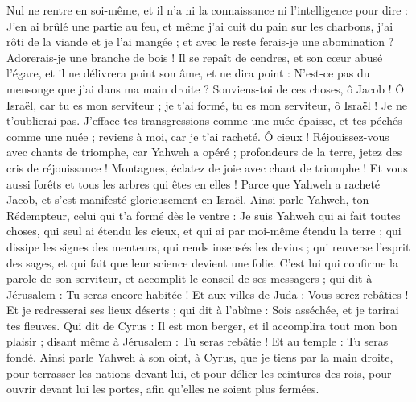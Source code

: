 \begin{multicols}{2}
Nul ne rentre en soi-même, et il n'a ni la connaissance ni l'intelligence pour dire : J'en ai brûlé une partie au feu, et même j'ai cuit du pain sur les charbons, j'ai rôti de la viande et je l'ai mangée ; et avec le reste ferais-je une abomination ? Adorerais-je une branche de bois !
Il se repaît de cendres, et son cœur abusé l'égare, et il ne délivrera point son âme, et ne dira point : N'est-ce pas du mensonge que j'ai dans ma main droite ?
Souviens-toi de ces choses, ô Jacob ! Ô Israël, car tu es mon serviteur ; je t'ai formé, tu es mon serviteur, ô Israël ! Je ne t'oublierai pas.
J'efface tes transgressions comme une nuée épaisse, et tes péchés comme une nuée ; reviens à moi, car je t'ai racheté.
Ô cieux ! Réjouissez-vous avec chants de triomphe, car Yahweh a opéré ; profondeurs de la terre, jetez des cris de réjouissance ! Montagnes, éclatez de joie avec chant de triomphe ! Et vous aussi forêts et tous les arbres qui êtes en elles ! Parce que Yahweh a racheté Jacob, et s'est manifesté glorieusement en Israël.
Ainsi parle Yahweh, ton Rédempteur, celui qui t'a formé dès le ventre : Je suis Yahweh qui ai fait toutes choses, qui seul ai étendu les cieux, et qui ai par moi-même étendu la terre ;
qui dissipe les signes des menteurs, qui rends insensés les devins ; qui renverse l'esprit des sages, et qui fait que leur science devient une folie.
C'est lui qui confirme la parole de son serviteur, et accomplit le conseil  de ses messagers ; qui dit à Jérusalem : Tu seras encore habitée ! Et aux villes de Juda : Vous serez rebâties ! Et je redresserai ses lieux déserts ;
qui dit à l'abîme : Sois asséchée, et je tarirai tes fleuves.
Qui dit de Cyrus : Il est mon berger, et il accomplira tout mon bon plaisir ; disant même à Jérusalem : Tu seras rebâtie ! Et au temple : Tu seras fondé.
\VerseOne{}Ainsi parle Yahweh à son oint, à Cyrus,
que je tiens par la main droite, pour terrasser les nations devant lui, et pour délier les ceintures des rois, pour ouvrir devant lui les portes, afin qu'elles ne soient plus fermées.

\end{multicols}
